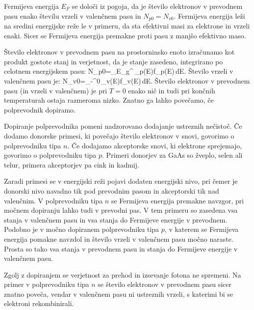 \begin{remark}
Fermijeva energija $E_F$ se določi iz pogoja, da je število elektronov v prevodnem pasu enako 
številu vrzeli v valenčnem pasu in $N_{p0} = N_{v0}$. Fermijeva energija
leži na sredini energijske reže le v primeru, da sta efektivni masi 
za elektrone in vrzeli enaki. Sicer se Fermijeva energija premakne
proti pasu z manjšo efektivno maso. 
\end{remark}

Število elektronov v prevodnem pasu na prostorninsko enoto izračunamo kot 
produkt gostote stanj in verjetnost, da je stanje zasedeno, integrirano po 
celotnem energijskem pasu:
\beq
N_{p0}=\int_{E_g}^{\infty}\,\rho_p(E)f_p(E)\,dE.
\label{6.3a}
\eeq
Število vrzeli v valenčnem pasu je: 
\beq
N_{v0}=\int_{-\infty}^{0}\,\rho_v(E)f_v(E)\,dE.
\label{6.3b}
\eeq
Število elektronov v prevodnem pasu (in vrzeli v valenčnem) je pri
$T=0$ enako nič in tudi pri končnih temperaturah ostaja razmeroma nizko. 
Znatno ga lahko povečamo, če polprevodnik dopiramo.

Dopiranje polprevodnika pomeni nadzorovano dodajanje ustreznih nečistoč. 
Če dodamo donorske primesi, ki povečajo število elektronov v snovi, 
govorimo o polprevodniku tipa $n$. Če dodajamo akceptorske snovi, ki 
elektrone sprejemajo, govorimo o polprevodniku tipa $p$. 
Primeri donorjev za GaAs so žveplo, selen ali telur,
primera akceptorjev pa cink in kadmij. 

Zaradi primesi se v energijski 
reži pojavi dodaten energijski nivo, pri čemer je donorski nivo navadno 
tik pod prevodnim pasom in akceptorski tik nad valenčnim. V polprevodniku tipa $n$ se
Fermijeva energija premakne navzgor, pri močnem dopiranju lahko tudi v 
prevodni pas. V tem primeru so zasedena vsa stanja v valenčnem pasu in vsa
stanja do Fermijeve energije v prevodnem. Podobno je v močno dopiranem polprevodniku tipa 
$p$, v katerem se Fermijeva energija pomakne navzdol in število vrzeli v valenčnem 
pasu močno naraste. Prosta so tako vsa stanja v prevodnem pasu in stanja do 
Fermijeve energije v valenčnem pasu.

\begin{remark}
 Zgolj z dopiranjem se verjetnost za prehod in izsevanje fotona ne spremeni. 
 Na primer v polprevodniku tipa $n$ se število 
 elektronov v prevodnem pasu sicer znatno poveča, 
 vendar v valenčnem pasu ni ustreznih vrzeli, s katerimi bi se elektroni rekombinirali.
\end{remark}

